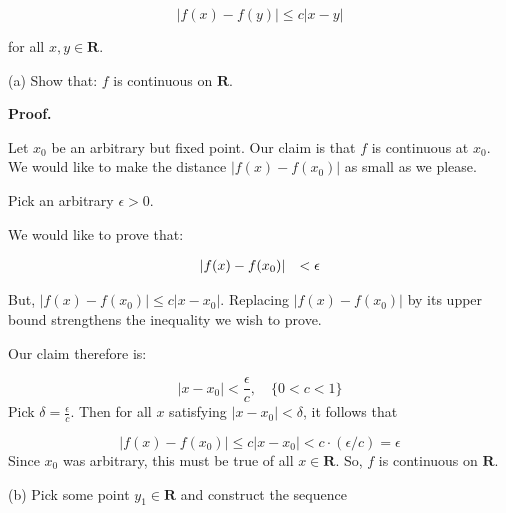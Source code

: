 \documentclass[10pt]{article}
\begin{document}
\begin{equation*}
|f( x) -f( y) |\leq c|x-y|
\end{equation*}


for all $\displaystyle x,y\in \mathbf{R}$. 



(a) Show that: $\displaystyle f$ is continuous on $\displaystyle \mathbf{R}$.



\textbf{Proof.}



Let $\displaystyle x_{0}$ be an arbitrary but fixed point. Our claim is that $\displaystyle f$ is continuous at $\displaystyle x_{0}$. We would like to make the distance $\displaystyle |f( x) -f( x_{0}) |$ as small as we please.



Pick an arbitrary $\displaystyle \epsilon  >0$.



We would like to prove that:


\begin{equation*}
\begin{array}{ c c }
|f( x) -f( x_{0}) | & < \epsilon 
\end{array}
\end{equation*}


But, $\displaystyle |f( x) -f( x_{0}) |\leq c|x-x_{0} |$. Replacing $\displaystyle |f( x) -f( x_{0}) |$ by its upper bound strengthens the inequality we wish to prove.



Our claim therefore is:


\begin{equation*}
|x-x_{0} |< \frac{\epsilon }{c} ,\quad \{0< c< 1\}
\end{equation*}
Pick $\displaystyle \delta =\frac{\epsilon }{c}$. Then for all $\displaystyle x$ satisfying $\displaystyle |x-x_{0} |< \delta $, it follows that 


\begin{equation*}
|f( x) -f( x_{0}) |\leq c|x-x_{0} |< c\cdot ( \epsilon /c) =\epsilon 
\end{equation*}
Since $\displaystyle x_{0}$ was arbitrary, this must be true of all $\displaystyle x\in \mathbf{R}$. So, $\displaystyle f$ is continuous on $\displaystyle \mathbf{R}$.



(b) Pick some point $\displaystyle y_{1} \in \mathbf{R}$ and construct the sequence
\end{document}
